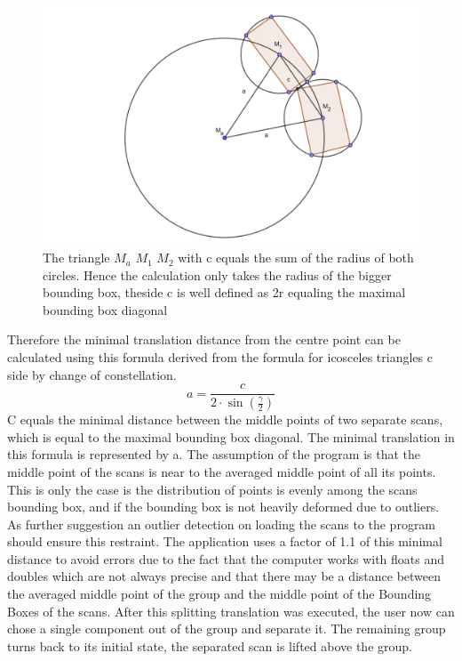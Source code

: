 \documentclass[hyperref,english,bachelorofscience,bibnum,twoside]{cgvpub}
\begin{document}
\begin{figure}[htbp]
	\centering
		\includegraphics[width= \linewidth]{ico_pic.png}
	\caption{The triangle $M_a$ $M_1$ $M_2$ with c equals the sum of the radius of both circles. Hence the calculation only takes the radius of the bigger bounding box, theside c is well defined as 2r equaling the maximal bounding box diagonal}
	\label{fig:ico}
\end{figure}

Therefore the minimal translation distance from the centre point can be calculated using this formula derived from the formula for icosceles triangles c side by change of constellation.
\[
{\displaystyle  a= {\frac {c}{2 \cdot \sin \left({\frac {\gamma }{2}}\right)}} }
\]
C equals the minimal distance between the middle points of two separate scans, which is equal to the maximal bounding box diagonal. The minimal translation in this formula is represented by a.
The assumption of the program is that the middle point of the scans is near to the averaged middle point of all its points. This is only the case is the distribution of points is evenly among the scans bounding box, and if the bounding box is not heavily deformed due to outliers.
As further suggestion an outlier detection on loading the scans to the program should ensure this restraint.
The application uses a factor of 1.1 of this minimal distance to avoid errors due to the fact that the computer works with floats and doubles which are not always precise and that there may be a distance between the averaged middle point of the group and the middle point of the Bounding Boxes of the scans.
After this splitting translation was executed, the user now can chose a single component out of the group and separate it. The remaining group turns back to its initial state, the separated scan is lifted above the group.
\end{document}
